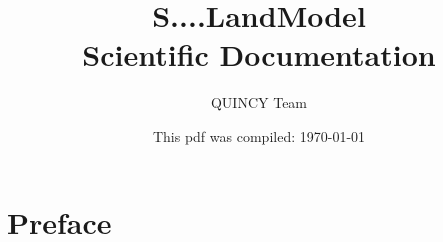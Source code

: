 \documentclass[11pt,oneside,openright,a4paper,fleqn]{book}  %
\begin{document}
\title{%
  \textbf{S}....\textbf{L}and\textbf{M}odel\\
  \large Scientific Documentation}
\author{QUINCY Team}
\date{This pdf was compiled: \today}
\maketitle


\newpage
\mbox{}

\tableofcontents



\chapter{Preface}

















 
 
\end{document}
